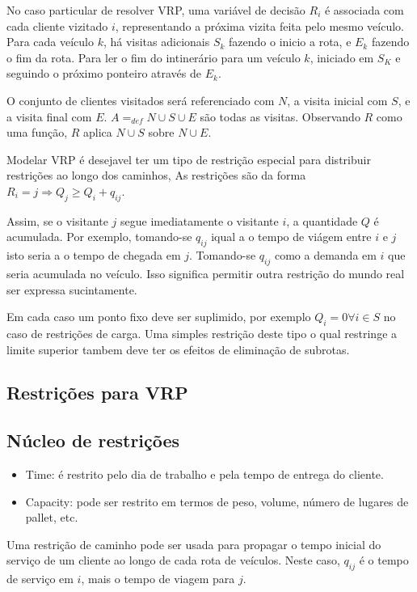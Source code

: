 \documentclass[a4paper, 12pt]{article}
\begin{document}
 No caso particular de resolver VRP, uma variável de decisão $R_i$ é associada com cada cliente
vizitado $i$, representando a próxima vizita feita pelo mesmo veículo. Para cada veículo $k$, há
visitas adicionais $S_k$ fazendo o inicio a rota, e $E_k$ fazendo o fim da rota. Para ler o fim do
intinerário para um veículo $k$, iniciado em $S_K$ e seguindo o próximo ponteiro através de $E_k$.

 O conjunto de clientes visitados será referenciado com $N$, a visita inicial com $S$, e a visita
final com $E$. $A =_{def} N\cup S\cup E$ são todas as visitas. Observando $R$ como uma função, $R$
aplica $N\cup S$ sobre $N\cup E$.

 Modelar VRP é desejavel ter um tipo de restrição especial para distribuir restrições ao longo dos
caminhos, As restrições são da forma $R_i = j \Rightarrow Q_j \geq Q_i + q_{ij}.$  

 Assim, se o visitante $j$ segue imediatamente o visitante $i$, a quantidade $Q$ é acumulada. Por
exemplo, tomando-se $q_{ij}$ iqual a o tempo de viágem entre $i$ e $j$ isto seria a o tempo de
chegada em $j$. Tomando-se $q_{ij}$ como a demanda em $i$ que seria acumulada no veículo. Isso
significa permitir outra restrição do mundo real ser expressa sucintamente.

 Em cada caso um ponto fixo deve ser suplimido, por exemplo $Q_i = 0 \forall i\in S$ no caso de
restrições de carga. Uma simples restrição deste tipo o qual restringe a limite superior tambem deve
ter os efeitos de eliminação de subrotas.

\subsection{Restrições para VRP}

\subsection{Núcleo de restrições}

\begin{itemize}
\item Time: é restrito pelo dia de trabalho e pela tempo de entrega do cliente.
\item Capacity: pode ser restrito em termos de peso, volume, número de lugares de pallet, etc.
\end{itemize}


 Uma restrição de caminho pode ser usada para propagar o tempo inicial do serviço de um cliente ao
longo de cada rota de veículos. Neste caso, $q_{ij}$ é o tempo de serviço em $i$, mais o tempo de
viagem para $j$.
\end{document}
